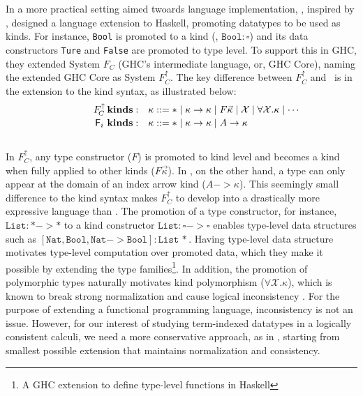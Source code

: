 In a more practical setting aimed twoards language implementation,
\citet{YorgeyWCJVM12}, inspired by \citet{SHE}, designed a language extension
to Haskell, promoting datatypes to be used as kinds. For instance, \texttt{Bool}
is promoted to a kind (\ie, $\texttt{Bool}:\square$) and its data constructors
\texttt{Ture} and \texttt{False} are promoted to type level. To support this
in GHC, they extended System $F_{\!C}$ (GHC's intermediate language, or,
GHC Core), naming the extended GHC Core as System $F_{\!C}^\uparrow$.
The key difference between $F_{\!C}^\uparrow$ and \Fi\ is in the extension
to the kind syntax, as illustrated below: \vspace*{-2pt}
\[\qquad\quad
\begin{array}{ll}
F_{\!C}^\uparrow\,\textbf{kinds}: &
\kappa ::= * \mid \kappa -> \kappa \mid F \vec{\kappa} \mid \mathcal{X} \mid \forall \mathcal{X}.\kappa \mid \cdots \\
\,\Fi\,\,\textbf{kinds}: &
\kappa ::= * \mid \kappa -> \kappa \mid A -> \kappa \phantom{A^{A^A}}
\end{array}  
\] ~\vspace*{-6pt}\\
In $F_{\!C}^\uparrow$, any type constructor ($F$) is promoted to 
kind level and becomes a kind when fully applied to other kinds
($F\vec\kappa$). In \Fi, on the other hand, a type can only appear
at the domain of an index arrow kind ($A-> \kappa$). This seemingly small
difference to the kind syntax makes $F_{\!C}^\uparrow$ to develop into
a drastically more expressive language than \Fi. The promotion of
a type constructor, for instance, $\texttt{List}:* -> *$ to a kind constructor
$\texttt{List}:\square-> \square$ enables type-level data structures
such as $\mathtt{[Nat,Bool,Nat-> Bool]:List\,*}$. Having type-level
data structure motivates type-level computation over promoted data,
which they make it possible by extending the type families\footnote{
	A GHC extension to define type-level functions in Haskell}.
In addition, the promotion of polymorphic types naturally motivates
kind polymorphism ($\forall \mathcal{X}.\kappa$), which is known to
break strong normalization and cause logical inconsistency \cite{Girard72}.
For the purpose of extending a functional programming language,
inconsistency is not an issue. However, for our interest of studying
term-indexed datatypes in a logically consistent calculi, we need
a more conservative approach, as in \Fi, starting from smallest possible
extension that maintains normalization and consistency.

